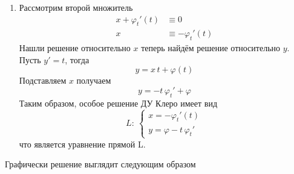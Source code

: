 \begin{Note}
\begin{enumerate}
        \item Рассмотрим второй множитель
        \begin{align*}
            x + \varphi_t'(t) &\equiv 0\\
            x &\equiv - \varphi_t'(t)
        \end{align*}
        Нашли решение относительно $x$ теперь найдём решение относительно $y$.\\
        Пусть $y' = t$, тогда
        \[
            y = x\,t + \varphi(t)
        \]
        Подставляем $x$ получаем
        \[
            y = -t\,\varphi_t' + \varphi
        \]
        Таким образом, особое решение ДУ Клеро имеет вид
        \[
           L :\: \begin{cases}
                x = - \varphi_t'(t)\\
                y = \varphi - t\,\varphi_t'
            \end{cases}
        \]
        что является уравнение прямой L.
    \end{enumerate}
    Графически решение выглядит следующим образом
    \begin{figure}[bh]
        \noindent{}
    \end{figure}
\end{Note}

